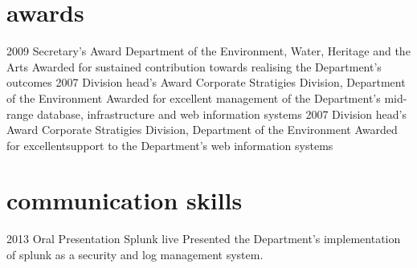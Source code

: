 \documentclass[]{friggeri-cv} %
\begin{document}
\begin{minipage}{\linewidth}
\section{awards}
\begin{entrylist}
\entry
{2009}
{Secretary's Award}
{Department of the Environment, Water, Heritage and the Arts}
{Awarded for sustained contribution towards realising the Department's outcomes}
\entry
{2007}
{Division head's Award}
{Corporate Stratigies Division, Department of the Environment}
{Awarded for excellent management of the Department's mid-range database, infrastructure and web information systems}
\entry
{2007}
{Division head's Award}
{Corporate Stratigies Division, Department of the Environment}
{Awarded for excellentsupport to the Department's web information systems}
\end{entrylist}
\end{minipage}


\section{communication skills}

\begin{entrylist}
\entry
{2013}
{Oral Presentation}
{Splunk live}
{Presented the Department's implementation of splunk as a security and log management system.}
\end{entrylist}

\end{document}

